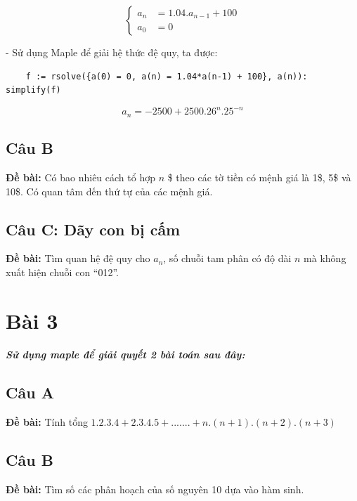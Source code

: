 \documentclass[12pt]{article}
\begin{document}
\begin{sloppypar}
\[
    \begin{cases}
        a_{n} & = 1.04.a_{n-1} + 100 \\             
        a_{0} & = 0
    \end{cases} 
    \]

- Sử dụng Maple để giải hệ thức đệ quy, ta được:

\begin{verbatim}
    f := rsolve({a(0) = 0, a(n) = 1.04*a(n-1) + 100}, a(n)): simplify(f)
\end{verbatim}

\begin{equation*}
    a_{n} = -2500 + 2500.26^{n}.25^{-n}
\end{equation*}

\subsection{Câu B}
\begin{tcolorbox}
    \textbf{Đề bài:} Có bao nhiêu cách tổ hợp \(n\) \$ theo các tờ tiền có mệnh giá là 1\$, 5\$ và 10\$. Có quan tâm đến thứ tự của các mệnh giá.
\end{tcolorbox}

\subsection{Câu C: Dãy con bị cấm}
\begin{tcolorbox}
    \textbf{Đề bài:} Tìm quan hệ đệ quy cho \(a_{n}\), số chuỗi tam phân có độ dài \(n\) mà không xuất hiện chuỗi con “012”.
\end{tcolorbox}

\section{Bài 3}
\subparagraph {Sử dụng maple để giải quyết 2 bài toán sau đây:}

\subsection{Câu A}
\begin{tcolorbox}
    \textbf{Đề bài:} Tính tổng \(1.2.3.4 + 2.3.4.5 + ....... + n.(n+1).(n+2).(n+3)\)
\end{tcolorbox}

\subsection{Câu B}
\begin{tcolorbox}
    \textbf{Đề bài:} Tìm số các phân hoạch của số nguyên 10 dựa vào hàm sinh.
\end{tcolorbox}


\end{sloppypar}
\end{document}
